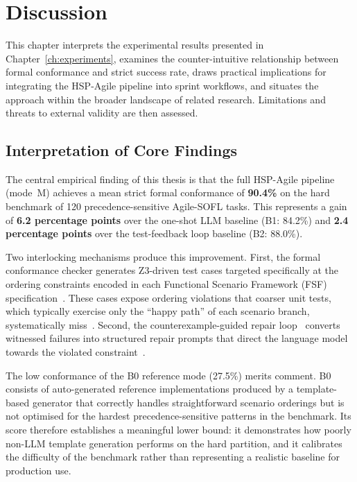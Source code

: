 \chapter{Discussion}
\label{ch:discussion}

This chapter interprets the experimental results presented in Chapter~\ref{ch:experiments},
examines the counter-intuitive relationship between formal conformance and strict success
rate, draws practical implications for integrating the HSP-Agile pipeline into sprint
workflows, and situates the approach within the broader landscape of related research.
Limitations and threats to external validity are then assessed.

\section{Interpretation of Core Findings}
\label{sec:disc:interpretation}

The central empirical finding of this thesis is that the full HSP-Agile pipeline (mode~M)
achieves a mean strict formal conformance of \textbf{90.4\%} on the hard benchmark of 120
precedence-sensitive Agile-SOFL tasks.  This represents a gain of \textbf{6.2 percentage
points} over the one-shot LLM baseline (B1: 84.2\%) and \textbf{2.4 percentage points}
over the test-feedback loop baseline (B2: 88.0\%).

Two interlocking mechanisms produce this improvement.  First, the formal conformance checker
generates Z3-driven test cases targeted specifically at the ordering constraints encoded in
each Functional Scenario Framework (FSF) specification~\citep{barrett2018smt,demoura2008z3,liu2014sofl}.
These cases expose ordering violations that coarser unit tests, which typically exercise only
the ``happy path'' of each scenario branch, systematically miss~\citep{zhu1997specification,ammann2016testing}.
Second, the counterexample-guided repair loop~\citep{solarlezama2008sketching}
converts witnessed failures into structured repair prompts that direct the language model
towards the violated constraint~\citep{lynn2024verifierloop,chen2021codex}.

The low conformance of the B0 reference mode (27.5\%) merits comment.  B0 consists of
auto-generated reference implementations produced by a template-based generator that
correctly handles straightforward scenario orderings but is not optimised for the
hardest precedence-sensitive patterns in the benchmark.  Its score therefore establishes a
meaningful lower bound: it demonstrates how poorly non-LLM template generation performs
on the hard partition, and it calibrates the difficulty of the benchmark rather than
representing a realistic baseline for production use.


